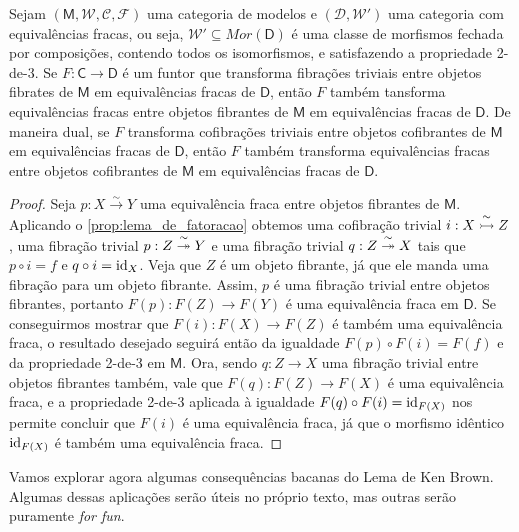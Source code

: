 \begin{corol}
  \label{corol:lema_de_brown}
  Sejam $(\mathsf{M},\mathcal{W},\mathcal{C},\mathcal{F})$ uma categoria de modelos e $(\mathcal{D},\mathcal{W}')$ uma categoria com equivalências fracas, ou seja, $\mathcal{W}' \subseteq Mor(\mathsf{D})$ é uma classe de morfismos fechada por composições, contendo todos os isomorfismos, e satisfazendo a propriedade 2-de-3.
  Se $F: \mathsf{C} \to \mathsf{D}$ é um funtor que transforma fibrações triviais entre objetos fibrates de $\mathsf{M}$ em equivalências fracas de $\mathsf{D}$, então $F$ também tansforma equivalências fracas entre objetos fibrantes de $\mathsf{M}$ em equivalências fracas de $\mathsf{D}$.
  De maneira dual, se $F$ transforma cofibrações triviais entre objetos cofibrantes de $\mathsf{M}$ em equivalências fracas de $\mathsf{D}$, então $F$ também transforma equivalências fracas entre objetos cofibrantes de $\mathsf{M}$ em equivalências fracas de $\mathsf{D}$.
\end{corol}

\begin{proof}
  Seja $p: X \overset{\sim}{\to} Y$ uma equivalência fraca entre objetos fibrantes de $\mathsf{M}$.
  Aplicando o \cref{prop:lema_de_fatoracao} obtemos uma cofibração trivial $i: X \overset{\sim}{\rightarrowtail} Z$, uma fibração trivial $p: Z \overset{\sim}{\twoheadrightarrow} Y$ e uma fibração trivial $q: Z \overset{\sim}{\twoheadrightarrow} X$ tais que $p \circ i = f$ e $q \circ i = \mathrm{id}_{X}$.
  Veja que $Z$ é um objeto fibrante, já que ele manda uma fibração para um objeto fibrante.
  Assim, $p$ é uma fibração trivial entre objetos fibrantes, portanto $F(p): F(Z) \to F(Y)$ é uma equivalência fraca em $\mathsf{D}$.
  Se conseguirmos mostrar que $F(i): F(X) \to F(Z)$ é também uma equivalência fraca, o resultado desejado seguirá então da igualdade $F(p) \circ F(i) = F(f)$ e da propriedade 2-de-3 em $\mathsf{M}$.
  Ora, sendo $q: Z \to X$ uma fibração trivial entre objetos fibrantes também, vale que $F(q): F(Z) \to F(X)$ é uma equivalência fraca, e a propriedade 2-de-3 aplicada à igualdade $F(q) \circ F(i) = \mathrm{id}_{F(X)}$ nos permite concluir que $F(i)$ é uma equivalência fraca, já que o morfismo idêntico $\mathrm{id}_{F(X)}$ é também uma equivalência fraca.
\end{proof}

Vamos explorar agora algumas consequências bacanas do Lema de Ken Brown.
Algumas dessas aplicações serão úteis no próprio texto, mas outras serão puramente \emph{for fun}.

